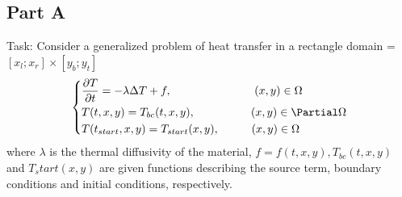 \documentclass[12pt]{article}
\begin{document}
\subsection*{Part A}
Task: Consider a generalized problem of heat transfer in a rectangle domain \Omega = $[x_{l};x_{r}]\times[y_{b};y_{t}]$
\begin{equation}
\begin{dcases}
\frac{\partial T}{\partial t} = -\lambda \Delta T + f,\hspace{2.58cm}(x,y) \in \Omega\\
T(t,x,y) = T_{bc}(t,x,y),\hspace{1.74cm}(x,y) \in \Partial \Omega\\
T(t_{start},x,y) = T_{start}(x,y),\hspace{1cm}(x,y) \in \Omega
\end{dcases}
\end{equation}
where $\lambda$ is the thermal diffusivity of the material, $f=f(t,x,y), T_{bc}(t,x,y)$ and $T_start(x,y)$ are given functions describing the source term, boundary conditions and initial conditions, respectively.
\end{document}
